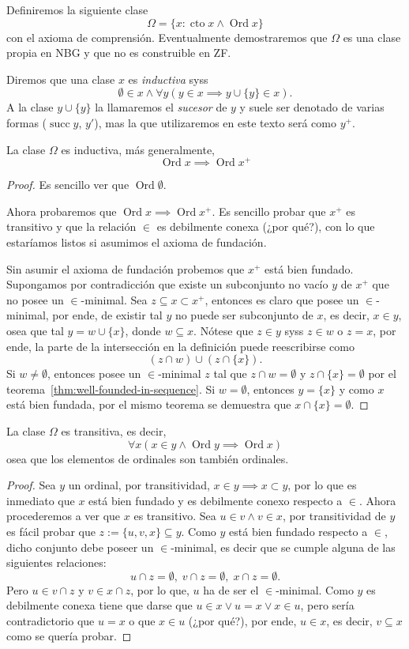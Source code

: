 \documentclass[11pt,a4paper]{book}
\DeclareMathOperator{\cto}{cto}
\DeclareMathOperator{\Ord}{Ord}
\begin{document}
Definiremos la siguiente clase
$$\Omega=\{x:\cto x\wedge\Ord x\}$$
con el axioma de comprensión. Eventualmente demostraremos que $\Omega$ es una clase propia en NBG y que no es construible en ZF.
\begin{mydef}
	Diremos que una clase $x$ es \textit{inductiva} syss
	$$\emptyset\in x\wedge\forall y(y\in x\implies y\cup\{y\}\in x).$$
	A la clase $y\cup\{y\}$ la llamaremos el \textit{sucesor} de $y$ y suele ser denotado de varias formas ($\mathop{succ}y$, $y'$), mas la que utilizaremos en este texto será como $y^+$.
\end{mydef}
\begin{thm}
	La clase $\Omega$ es inductiva, más generalmente,
	$$\Ord x\implies\Ord x^+$$
\end{thm}
\begin{proof}
	Es sencillo ver que $\Ord\emptyset$.

	Ahora probaremos que $\Ord x\implies\Ord x^+$. Es sencillo probar que $x^+$ es transitivo y que la relación $\in$ es debilmente conexa (¿por qué?), con lo que estaríamos listos si asumimos el axioma de fundación.

	Sin asumir el axioma de fundación probemos que $x^+$ está bien fundado. Supongamos por contradicción que existe un subconjunto no vacío $y$ de $x^+$ que no posee un $\in$-minimal. Sea $z\subseteq x\subset x^+$, entonces es claro que posee un $\in$-minimal, por ende, de existir tal $y$ no puede ser subconjunto de $x$, es decir, $x\in y$, osea que tal $y=w\cup\{x\}$, donde $w\subseteq x$. Nótese que $z\in y$ syss $z\in w$ o $z=x$, por ende, la parte de la intersección en la definición puede reescribirse como
	$$(z\cap w)\cup(z\cap\{x\}).$$
	Si $w\neq\emptyset$, entonces posee un $\in$-minimal $z$ tal que $z\cap w=\emptyset$ y $z\cap\{x\}=\emptyset$ por el teorema~\ref{thm:well-founded-in-sequence}. Si $w=\emptyset$, entonces $y=\{x\}$ y como $x$ está bien fundada, por el mismo teorema se demuestra que $x\cap\{x\}=\emptyset$.
\end{proof}
\begin{thm}
	La clase $\Omega$ es transitiva, es decir,
	$$\forall x(x\in y\wedge\Ord y\implies\Ord x)$$
	osea que los elementos de ordinales son también ordinales.
\end{thm}
\begin{proof}
	Sea $y$ un ordinal, por transitividad, $x\in y\implies x\subset y$, por lo que es inmediato que $x$ está bien fundado y es debilmente conexo respecto a $\in$. Ahora procederemos a ver que $x$ es transitivo. Sea $u\in v\wedge v\in x$, por transitividad de $y$ es fácil probar que $z:=\{u,v,x\}\subseteq y$. Como $y$ está bien fundado respecto a $\in$, dicho conjunto debe poseer un $\in$-minimal, es decir que se cumple alguna de las siguientes relaciones:
	$$u\cap z=\emptyset,\; v\cap z=\emptyset,\;x\cap z=\emptyset.$$
	Pero $u\in v\cap z$ y $v\in x\cap z$, por lo que, $u$ ha de ser el $\in$-minimal. Como $y$ es debilmente conexa tiene que darse que $u\in x\vee u=x\vee x\in u$, pero sería contradictorio que $u=x$ o que $x\in u$ (¿por qué?), por ende, $u\in x$, es decir, $v\subseteq x$ como se quería probar.
\end{proof}
\end{document}
